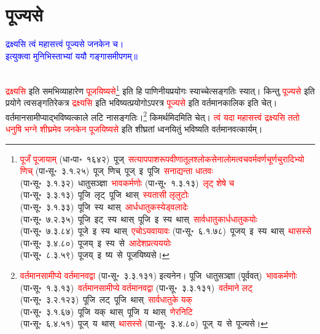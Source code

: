 \section[पूज्यसे]{पूज्यसे}
\centering\textcolor{blue}{द्रक्ष्यसि त्वं महासत्त्वं पूज्यसे जनकेन च।\nopagebreak\\
इत्युक्त्वा मुनिभिस्ताभ्यां ययौ गङ्गासमीपगम्॥}\nopagebreak\\
\\
\fontsize{14}{21}\selectfont\begin{sloppypar}\justifying\noindent\hspace{10mm} \textcolor{red}{द्रक्ष्यसि} इति समभिव्याहारेण \textcolor{red}{पूजयिष्यसे}\footnote{\textcolor{red}{पूजँ पूजायाम्} (धा॰पा॰~१६४२)~\arrow पूज्~\arrow \textcolor{red}{सत्याप\-पाश\-रूप\-वीणा\-तूल\-श्लोक\-सेना\-लोम\-त्वच\-वर्म\-वर्ण\-चूर्ण\-चुरादिभ्यो णिच्} (पा॰सू॰~३.१.२५)~\arrow पूज्~णिच्~\arrow पूज्~इ~\arrow पूजि~\arrow \textcolor{red}{सनाद्यन्ता धातवः} (पा॰सू॰~३.१.३२)~\arrow धातु\-सञ्ज्ञा~\arrow \textcolor{red}{भावकर्मणोः} (पा॰सू॰~१.३.१३)~\arrow \textcolor{red}{लृट् शेषे च} (पा॰सू॰~३.३.१३)~\arrow पूजि~लृट्~\arrow पूजि~थास्~\arrow \textcolor{red}{स्यतासी लृलुटोः} (पा॰सू॰~३.१.३३)~\arrow पूजि~स्य~थास्~\arrow \textcolor{red}{आर्धधातुकस्येड्वलादेः} (पा॰सू॰~७.२.३५)~\arrow पूजि~इट्~स्य~थास्~\arrow पूजि~इ~स्य~थास्~\arrow \textcolor{red}{सार्वधातुकार्धधातुकयोः} (पा॰सू॰~७.३.८४)~\arrow पूजे~इ~स्य~थास्~\arrow \textcolor{red}{एचोऽयवायावः} (पा॰सू॰~६.१.७८)~\arrow पूजय्~इ~स्य~थास्~\arrow \textcolor{red}{थासस्से} (पा॰सू॰~३.४.८०)~\arrow पूजय्~इ~स्य~से~\arrow \textcolor{red}{आदेश\-प्रत्यययोः} (पा॰सू॰~८.३.५९)~\arrow पूजय्~इ~ष्य~से~\arrow पूजयिष्यसे।} इति हि पाणिनीय\-प्रयोगः स्याच्चेत्सङ्गतिः स्यात्। किन्तु \textcolor{red}{पूज्यसे} इति प्रयोगे त्वसङ्गतिरेकत्र \textcolor{red}{द्रक्ष्यसि} इति भविष्यत्प्रयोगोऽपरत्र \textcolor{red}{पूज्यसे} इति वर्तमान\-कालिक इति चेत्। वर्तमान\-सामीप्याद्भविष्यत्काले लटि नासङ्गतिः।\footnote{\textcolor{red}{वर्तमान\-सामीप्ये वर्तमानवद्वा} (पा॰सू॰~३.३.१३१) इत्यनेन। पूजि~\arrow धातु\-सञ्ज्ञा (पूर्ववत्)~\arrow \textcolor{red}{भावकर्मणोः} (पा॰सू॰~१.३.१३)~\arrow \textcolor{red}{वर्तमान\-सामीप्ये वर्तमानवद्वा} (पा॰सू॰~३.३.१३१)~\arrow \textcolor{red}{वर्तमाने लट्} (पा॰सू॰~३.२.१२३)~\arrow पूजि~लट्~\arrow पूजि~थास्~\arrow \textcolor{red}{सार्वधातुके यक्} (पा॰सू॰~३.१.६७)~\arrow पूजि~यक्~थास्~\arrow पूजि~य~थास्~\arrow \textcolor{red}{णेरनिटि} (पा॰सू॰~६.४.५१)~\arrow पूज्~य~थास्~\arrow \textcolor{red}{थासस्से} (पा॰सू॰~३.४.८०)~\arrow पूज्~य~से~\arrow पूज्यसे।} किमर्थमिदमिति चेत्। \textcolor{red}{त्वं यदा महासत्त्वं द्रक्ष्यसि ततो धनुषि भग्ने शीघ्रमेव जनकेन पूजयिष्यसे} इति शीघ्रतां ध्वनयितुं भविष्यति वर्तमान\-वत्कार्यम्।\end{sloppypar}
